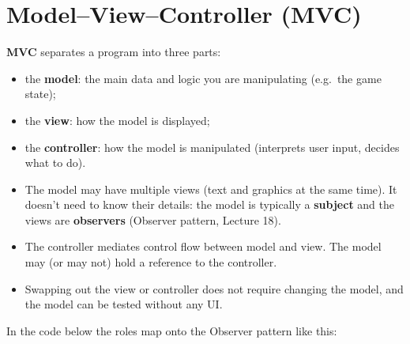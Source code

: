 \section{Model--View--Controller (MVC)}
\begin{definition}
\textbf{MVC} separates a program into three parts:
\begin{itemize}
  \item the \textbf{model}: the main data and logic you are manipulating (e.g.\
        the game state);
  \item the \textbf{view}: how the model is displayed;
  \item the \textbf{controller}: how the model is manipulated (interprets user
        input, decides what to do).
\end{itemize}
\end{definition}

\begin{center}
\end{center}

\begin{itemize}
  \item The model may have multiple views (text and graphics at the same time).
        It doesn't need to know their details: the model is typically a
        \textbf{subject} and the views are \textbf{observers} (Observer pattern,
        Lecture 18).
  \item The controller mediates control flow between model and view. The model
        may (or may not) hold a reference to the controller.
  \item Swapping out the view or controller does not require changing the model,
        and the model can be tested without any UI.
\end{itemize}
In the code below the roles map onto the Observer pattern like this:
\begin{center}
\end{center}

